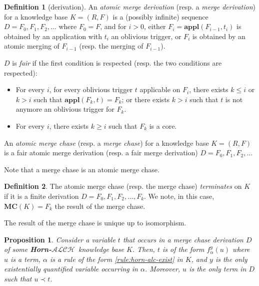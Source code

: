 \documentclass{article}
\newtheorem{proposition}{Proposition}[section]
\theoremstyle{definition}
\newtheorem{definition}{Definition}[section]
\theoremstyle{remark}
\newcommand{\MC}{\textbf{MC}}
\newcommand{\Appl}{\textbf{appl}}
\newcommand{\ALCH}{\textbf{Horn-$\mathcal{ALCH}$}}
\begin{document}
\begin{definition}[derivation]
An \emph{atomic merge derivation} (resp. a \emph{merge derivation}) for a knowledge base $K = (R,F)$ is a (possibly infinite) sequence $D = F_0, F_1, F_2, \ldots$ where $F_0 = F$, and for $i >0$, either $F_{i}= \Appl(F_{i-1},t_i)$ is obtained by an application with $t_i$ an oblivious trigger, or $F_i$ is obtained by an atomic merging of $F_{i-1}$ (resp. the merging of $F_{i-1}$).

$D$ is \emph{fair} if the first condition is respected (resp. the two conditions are respected): 
\begin{itemize}
\item For every $i$, for every oblivious trigger $t$ applicable on $F_i$, there exists $k \leq i$ or $k > i$ such that $\Appl(F_{k},t) = F_k$; or there exists $k > i$ such that $t$ is not anymore an oblivious trigger for $F_k$.
\item For every $i$, there exists $k \geq i$ such that $F_k$ is a core.
\end{itemize}

An \emph{atomic merge chase} (resp. a \emph{merge chase}) for a knowledge base $K= (R,F)$ is a fair atomic merge derivation (resp. a fair merge derivation) $D=F_0,F_1,F_2,\ldots$
\end{definition}

Note that a merge chase is an atomic merge chase.

\begin{definition}
The atomic merge chase (resp. the merge chase)  \emph{terminates} on $K$ if it is a finite derivation $D=F_0,F_1,F_2,\ldots,F_k$. We note, in this case, $\MC(K) = F_k$ the result of the merge chase.
\end{definition}

The result of the merge chase is unique up to isomorphism.


 
\begin{proposition} \label{prec}
Consider a variable $t$ that occurs in a merge chase derivation $D$ of some \ALCH\ knowledge base $K$.
Then, $t$ is of the form $f^y_\alpha(u)$ where $u$ is a term, $\alpha$ is a rule of the form \ref{rule:horn-alc-exist} in $K$, and $y$ is the only existentially quantified variable occurring in $\alpha$.
Moreover, $u$ is the only term in $D$ such that $u \prec t$.
\end{proposition}
\end{document}
